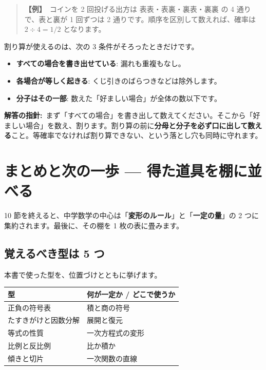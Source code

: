 \documentclass{article}
\begin{document}
\begin{quote}
\textbf{【例】}\ コインを 2 回投げる出方は 表表・表裏・裏表・裏裏 の 4 通りで、表と裏が 1 回ずつは 2 通りです。順序を区別して数えれば、確率は \(2 \div 4 = 1/2\) となります。
\end{quote}

割り算が使えるのは、次の 3 条件がそろったときだけです。

\begin{itemize}
\item \textbf{すべての場合を書き出せている}: 漏れも重複もなし。
\item \textbf{各場合が等しく起きる}: くじ引きのばらつきなどは除外します。
\item \textbf{分子はその一部}: 数えた「好ましい場合」が全体の数以下です。
\end{itemize}

\textbf{解答の指針:}\ まず「すべての場合」を書き出して数えてください。そこから「好ましい場合」を数え、割ります。割り算の前に\textbf{分母と分子を必ず口に出して数える}こと。等確率でなければ割り算できない、という落とし穴も同時に守れます。

\section{まとめと次の一歩 — 得た道具を棚に並べる}

10 節を終えると、中学数学の中心は「\textbf{変形のルール}」と「\textbf{一定の量}」の 2 つに集約されます。最後に、その棚を 1 枚の表に畳みます。

\subsection{覚えるべき型は 5 つ}

本書で使った型を、位置づけとともに挙げます。

\begin{center}
\begin{tabular}{|l|l|}
\hline
型 & 何が一定か / どこで使うか \\
\hline
正負の符号表 & 積と商の符号 \\
\hline
たすきがけと因数分解 & 展開と復元 \\
\hline
等式の性質 & 一次方程式の変形 \\
\hline
比例と反比例 & 比か積か \\
\hline
傾きと切片 & 一次関数の直線 \\
\hline
\end{tabular}
\end{center}
\end{document}
